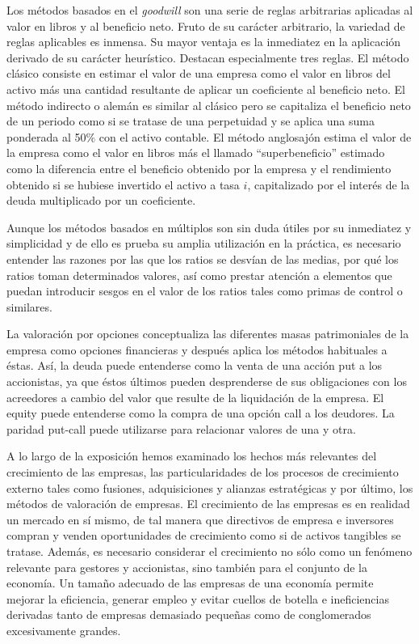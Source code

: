 \documentclass{nuevotema}
\begin{document}
Los métodos basados en el \textit{goodwill} son una serie de reglas arbitrarias aplicadas al valor en libros y al beneficio neto. Fruto de su carácter arbitrario, la variedad de reglas aplicables es inmensa. Su mayor ventaja es la inmediatez en la aplicación derivado de su carácter heurístico. Destacan especialmente tres reglas. El método clásico consiste en estimar el valor de una empresa como el valor en libros del activo más una cantidad resultante de aplicar un coeficiente al beneficio neto. El método indirecto o alemán es similar al clásico pero se capitaliza el beneficio neto de un periodo como si se tratase de una perpetuidad y se aplica una suma ponderada al 50\% con el activo contable. El método anglosajón estima el valor de la empresa como el valor en libros más el llamado ``superbeneficio'' estimado como la diferencia entre el beneficio obtenido por la empresa y el rendimiento obtenido si se hubiese invertido el activo a tasa $i$, capitalizado por el interés de la deuda multiplicado por un coeficiente.

Aunque los métodos basados en múltiplos son sin duda útiles por su inmediatez y simplicidad y de ello es prueba su amplia utilización en la práctica, es necesario entender las razones por las que los ratios se desvían de las medias, por qué los ratios toman determinados valores, así como prestar atención a elementos que puedan introducir sesgos en el valor de los ratios tales como primas de control o similares.

La valoración por opciones conceptualiza las diferentes masas patrimoniales de la empresa como opciones financieras y después aplica los métodos habituales a éstas. Así, la deuda puede entenderse como la venta de una acción put a los accionistas, ya que éstos últimos pueden desprenderse de sus obligaciones con los acreedores a cambio del valor que resulte de la liquidación de la empresa. El equity puede entenderse como la compra de una opción call a los deudores. La paridad put-call puede utilizarse para relacionar valores de una y otra. 

A lo largo de la exposición hemos examinado los hechos más relevantes del crecimiento de las empresas, las particularidades de los procesos de crecimiento externo tales como fusiones, adquisiciones y alianzas estratégicas y por último, los métodos de valoración de empresas. El crecimiento de las empresas es en realidad un mercado en sí mismo, de tal manera que directivos de empresa e inversores compran y venden oportunidades de crecimiento como si de activos tangibles se tratase. Además, es necesario considerar el crecimiento no sólo como un fenómeno relevante para gestores y accionistas, sino también para el conjunto de la economía. Un tamaño adecuado de las empresas de una economía permite mejorar la eficiencia, generar empleo y evitar cuellos de botella e ineficiencias derivadas tanto de empresas demasiado pequeñas como de conglomerados excesivamente grandes.
\end{document}
